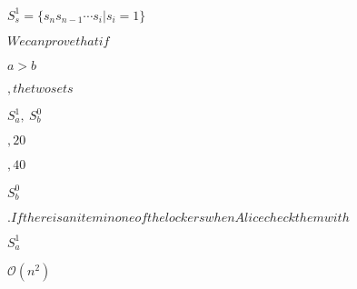 \documentclass[10pt]{book}
\begin{document}
\begin{mdSnippets}
\begin{mdInlineSnippet}[d41d8cd98f00b204e9800998ecf8427e]%
$$\end{mdInlineSnippet}%
\begin{mdInlineSnippet}[8a8d028373bd76214e8ce1685765ef6f]%
$S_s^1=\{s_ns_{n-1}\cdots s_{i}|s_i=1\}$\end{mdInlineSnippet}%
\begin{mdInlineSnippet}[72f650ffda6d32a956c8bd4c62f81b05]%
$We can prove that if $\end{mdInlineSnippet}%
\begin{mdInlineSnippet}[46fa7900cc397f3a4b3fa2e72d6885e7]%
$a>b$\end{mdInlineSnippet}%
\begin{mdInlineSnippet}[7c24f09512cd6e54ee63b10d02a984f4]%
$, the two sets $\end{mdInlineSnippet}%
\begin{mdInlineSnippet}[d899d1cc501b5b019a50b736e154325b]%
$S_a^1,\ S_b^0$\end{mdInlineSnippet}%
\begin{mdInlineSnippet}%
$, 20$\end{mdInlineSnippet}%
\begin{mdInlineSnippet}[f55e4dbb4b194b29fc9f6075bb055fc7]%
$, 40$\end{mdInlineSnippet}%
\begin{mdInlineSnippet}%
$S_b^0$\end{mdInlineSnippet}%
\begin{mdInlineSnippet}[8bdcc9a1683652e05d1206b559df5891]%
$.If there is an item in one of the lockers when Alice check them with $\end{mdInlineSnippet}%
\begin{mdInlineSnippet}[f16f9b7d67d2017ef9f6202b752df04d]%
$S_a^1$\end{mdInlineSnippet}%
\begin{mdInlineSnippet}[551894444bf3cb0cc8350594310e2e99]%
$\mathcal{O}(n^2)$\end{mdInlineSnippet}%

\end{mdSnippets}
\end{document}
